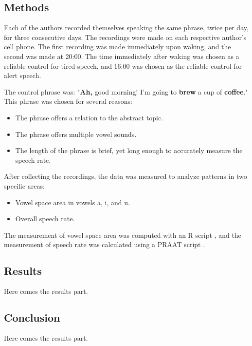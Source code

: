 \documentclass[runningheads]{llncs}
\begin{document}
%

\subsection*{Methods}
Each of the authors recorded themselves speaking the same phrase, twice per day, for three consecutive days. The recordings were made on 
each respective author's cell phone. The first recording was made immediately upon waking, and the second was made at 20:00. The time 
immediately after waking was chosen as a reliable control for tired speech, and 16:00 was chosen as the reliable control for alert speech.

The control phrase was: "\textbf{Ah,} good morning! I'm going to \textbf{brew} a cup of \textbf{coffee}." This phrase was chosen for
several reasons:
\begin{itemize}
    \item The phrase offers a relation to the abstract topic.
    \item The phrase offers multiple vowel sounds.
    \item The length of the phrase is brief, yet long enough to accurately measure the speech rate.
\end{itemize}

After collecting the recordings, the data was measured to analyze patterns in two specific areas:
\begin{itemize}
    \item Vowel space area in vowels a, i, and  u.
    \item Overall speech rate.
\end{itemize}

The measurement of vowel space area was computed with an R script \cite{Rscript}, and the measurement of speech rate was calculated using 
a PRAAT script \cite{praatscript}. 
\subsection*{Results}

Here comes the results part.

\subsection*{Conclusion}
Here comes the results part.

\end{document}
